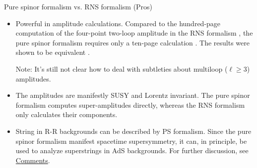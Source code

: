 \documentclass{beamer}
\begin{document}
\begin{frame}{Pure spinor formalism vs. RNS formalism (Pros)}
	\begin{itemize}
		\item {\color{WHU} Powerful in amplitude calculations.} Compared to the hundred-page computation of the four-point two-loop amplitude in the RNS formalism \cite{hundred}, the pure spinor formalism requires only a ten-page calculation \cite{ten}. The results were shown to be equivalent \cite{equiv}.
		
		{\color{WHU}Note:} It's still not clear how to deal with subtleties about multiloop ($\ell\geq 3$) amplitudes. 
		\item {\color{WHU} The amplitudes are manifestly SUSY and Lorentz invariant.} The pure spinor formalism computes super-amplitudes directly, whereas the RNS formalism only calculates their components.
		\item {\color{WHU} String in R-R backgrounds can be described by PS formalism.} Since the pure spinor formalism manifest spacetime supersymmetry, it can, {\color{WHU} in principle}, be used to analyze superstrings in AdS backgrounds\cite{Berkovits:2000yr}. For further discussion, see \hyperlink{comments}{\color{blue}Comments}.
	\end{itemize}
\end{frame}
\end{document}
